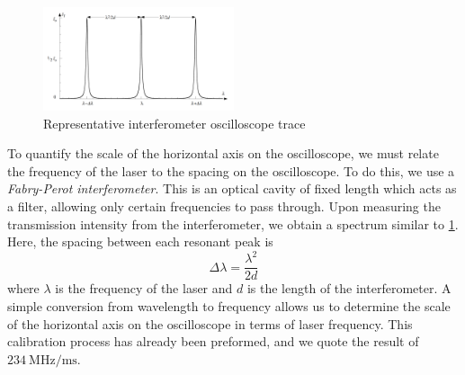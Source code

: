 \documentclass[12pt]{article}
\begin{document}
		\begin{figure}
			\includegraphics[width=0.5\textwidth]{DiodeLaser/InterferometerScan.png}
			\caption{Representative interferometer oscilloscope trace}
			\label{interferometerScan}
		\end{figure}
		To quantify the scale of the horizontal axis on the oscilloscope, we must relate the frequency of the laser to the spacing on the oscilloscope. To do this, we use a \emph{Fabry-Perot interferometer}. This is an optical cavity of fixed length which acts as a filter, allowing only certain frequencies to pass through. Upon measuring the transmission intensity from the interferometer, we obtain a spectrum similar to \cref{interferometerScan}. Here, the spacing between each resonant peak is 
		\begin{equation}
			\Delta \lambda = \frac{\lambda^2}{2d}
		\end{equation}
		where $\lambda$ is the frequency of the laser and $d$ is the length of the interferometer. A simple conversion from wavelength to frequency allows us to determine the scale of the horizontal axis on the oscilloscope in terms of laser frequency. This calibration process has already been preformed, and we quote the result of $234 \ \text{MHz/ms}$.
	
	
\end{document}

